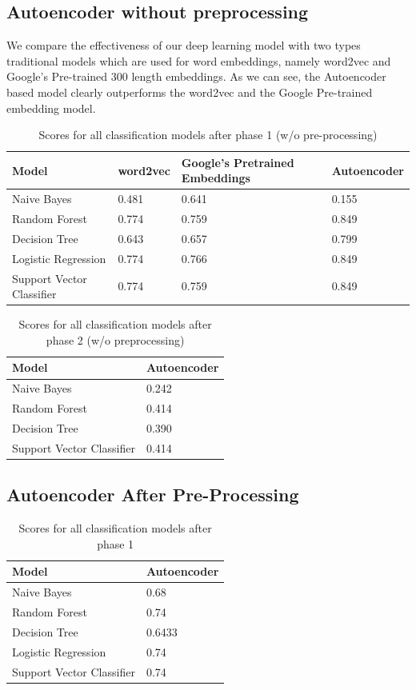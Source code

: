 \documentclass[a4paper,11pt]{article}
\begin{document}
\subsection{Autoencoder without preprocessing}
We compare the effectiveness of our deep learning model with two types traditional models which are used for word embeddings, namely word2vec and Google's Pre-trained 300 length embeddings. As we can see, the Autoencoder based model clearly outperforms the word2vec and the Google Pre-trained embedding model.
\begin{table}[!htbp]
\caption{Scores for all classification models after phase 1 (w/o pre-processing)}
\centering
\begin{tabular}{|p{5cm}|p{1.5cm}|p{4.8cm}|p{2cm}|} 
\hline
Model&word2vec&Google's Pretrained Embeddings&Autoencoder \\
 \hline \hline
Naive Bayes & 0.481  & 0.641 & 0.155 \\ 
 \hline
Random Forest & 0.774  & 0.759 & 0.849 \\  
\hline
Decision Tree & 0.643  & 0.657 & 0.799 \\
\hline
Logistic Regression & 0.774  & 0.766 & 0.849 \\ 
\hline
Support Vector Classifier & 0.774  & 0.759 & 0.849 \\
\hline
\end{tabular}
\label{tab:lab1}
\end{table}

\begin{table}[!htbp]
\caption{Scores for all classification models after phase 2 (w/o preprocessing)}
\medskip
\centering
\begin{tabular}{|p{5cm}|p{4cm}|}
\hline
Model&Autoencoder \\
\hline \hline
Naive Bayes & 0.242 \\ 
\hline
Random Forest & 0.414\\  
\hline
Decision Tree &  0.390\\
\hline
Support Vector Classifier  & 0.414\\
\hline
\end{tabular}
\label{tab:lab1}
\end{table}

\newpage
\subsection{Autoencoder After Pre-Processing}


\begin{table}[!htbp]
\caption{Scores for all classification models after phase 1}
\centering
\begin{tabular}{|p{5cm}|p{4cm}|} 
\hline
Model&Autoencoder \\
 \hline \hline
Naive Bayes  & 0.68 \\ 
 \hline
Random Forest  & 0.74 \\  
\hline
Decision Tree & 0.6433 \\
\hline
Logistic Regression  & 0.74 \\ 
\hline
Support Vector Classifier  & 0.74 \\
\hline
\end{tabular}
\label{tab:lab1}
\end{table}
\end{document}
